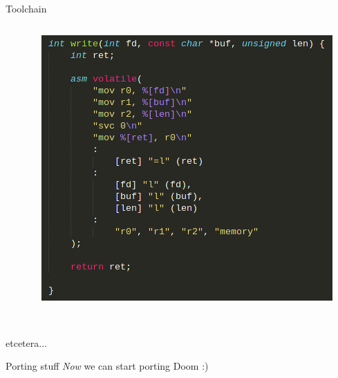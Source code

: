 \documentclass[12pt,aspectratio=169]{beamer}
\begin{document}
\begin{frame}{Toolchain}
\begin{columns}
\begin{column}{0.33\textwidth}
	\end{column}
	\begin{column}{0.33\textwidth}
		\includegraphics[width=\textwidth]{media/syscall_write}
	\end{column}
\end{columns}
~\\
etcetera...
\end{frame}



\begin{frame}{Porting stuff}
	\emph{Now} we can start porting Doom :)
	~\\~\\~\\
	\large
\end{frame}
\end{document}

